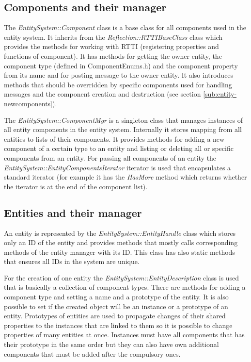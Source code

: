 \subsection{Components and their manager}

The \emph{EntitySystem::Component} class is a base class for all components used in the entity system. It inherits from the \emph{Reflection::RTTIBaseClass} class which provides the methods for working with RTTI (registering properties and functions of component). It has methods for getting the owner entity, the component type (defined in ComponentEnums.h) and the component property from its name and for posting message to the owner entity. It also introduces methods that should be overridden by specific components used for handling messages and the component creation and destruction (see section \ref{sub:entity-newcomponents}).

The \emph{EntitySystem::ComponentMgr} is a singleton class that manages instances of all entity components in the entity system. Internally it stores mapping from all entities to lists of their components. It provides methods for adding a new component of a certain type to an entity and listing or deleting all or specific components from an entity. For passing all components of an entity the \emph{EntitySystem::EntityComponentsIterator} iterator is used that encapsulates a standard iterator (for example it has the \emph{HasMore} method which returns whether the iterator is at the end of the component list).

\subsection{Entities and their manager}

An entity is represented by the \emph{EntitySystem::EntityHandle} class which sto\-res only an ID of the entity and provides methods that mostly calls corresponding methods of the entity manager with its ID. This class has also static methods that ensures all IDs in the system are unique.

For the creation of one entity the \emph{EntitySystem::EntityDescription} class is used that is basically a collection of component types. There are methods for adding a component type and setting a name and a prototype of the entity. It is also possible to set if the created object will be an instance or a prototype of an entity. Prototypes of entities are used to propagate changes of their shared properties to the instances that are linked to them so it is possible to change properties of many entities at once. Instances must have all components that has their prototype in the same order but they can also have own additional components that must be added after the compulsory ones.

